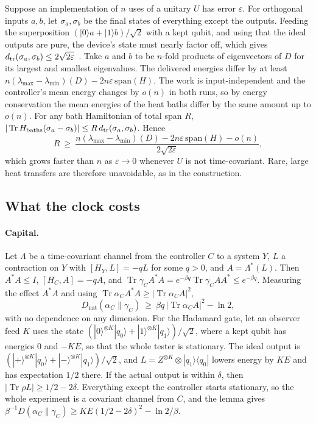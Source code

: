 \documentclass[11pt]{article}
\theoremstyle{definition}
\theoremstyle{remark}
\newcommand{\Tr}{\operatorname{Tr}}
\begin{document}
Suppose an implementation of $n$ uses of a unitary $U$ has error $\varepsilon$. For orthogonal inputs $a,b$, let $\sigma_a,\sigma_b$ be the final states of everything except the outputs. Feeding the superposition $(|0\rangle a+|1\rangle b)/\sqrt2$ with a kept qubit, and using that the ideal outputs are pure, the device's state must nearly factor off, which gives $d_{\rm tr}(\sigma_a,\sigma_b)\le2\sqrt{2\varepsilon}$~\cite{KSW08}. Take $a$ and $b$ to be $n$-fold products of eigenvectors of $D$ for its largest and smallest eigenvalues. The delivered energies differ by at least $n(\lambda_{\max}-\lambda_{\min})(D)-2n\varepsilon\,\mathrm{span}(H)$. The work is input-independent and the controller's mean energy changes by $o(n)$ in both runs, so by energy conservation the mean energies of the heat baths differ by the same amount up to $o(n)$. For any bath Hamiltonian of total span $R$, $|\Tr H_{\mathrm{baths}}(\sigma_a-\sigma_b)|\le R\,d_{\rm tr}(\sigma_a,\sigma_b)$. Hence
\[
R\ \ge\ \frac{n(\lambda_{\max}-\lambda_{\min})(D)-2n\varepsilon\,\mathrm{span}(H)-o(n)}{2\sqrt{2\varepsilon}},
\]
which grows faster than $n$ as $\varepsilon\to0$ whenever $U$ is not time-covariant. Rare, large heat transfers are therefore unavoidable, as in the construction.



\subsection{What the clock costs}\label{pf:costs}

\paragraph{Capital.} Let $\Lambda$ be a time-covariant channel from the controller $C$ to a system $Y$, $L$ a contraction on $Y$ with $[H_Y,L]=-qL$ for some $q>0$, and $A=\Lambda^*(L)$. Then $A^*A\le I$, $[H_C,A]=-qA$, and $\Tr\gamma_CA^*A=e^{-\beta q}\Tr\gamma_CAA^*\le e^{-\beta q}$. Measuring the effect $A^*A$ and using $\Tr\alpha_CA^*A\ge|\Tr\alpha_CA|^2$,
\[
D_{\mathrm{nat}}(\alpha_C\|\gamma_C)\ \ge\ \beta q\,|\Tr\alpha_CA|^2-\ln2,
\]
with no dependence on any dimension. For the Hadamard gate, let an observer feed $K$ uses the state $(|0\rangle^{\otimes K}|q_0\rangle+|1\rangle^{\otimes K}|q_1\rangle)/\sqrt2$, where a kept qubit has energies $0$ and $-KE$, so that the whole tester is stationary. The ideal output is $(|+\rangle^{\otimes K}|q_0\rangle+|-\rangle^{\otimes K}|q_1\rangle)/\sqrt2$, and $L=Z^{\otimes K}\otimes|q_1\rangle\langle q_0|$ lowers energy by $KE$ and has expectation $1/2$ there. If the actual output is within $\delta$, then $|\Tr\rho L|\ge1/2-2\delta$. Everything except the controller starts stationary, so the whole experiment is a covariant channel from $C$, and the lemma gives $\beta^{-1}D(\alpha_C\|\gamma_C)\ge KE(1/2-2\delta)^2-\ln2/\beta$.
\end{document}
